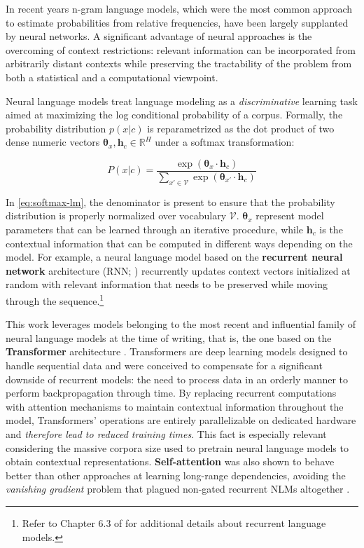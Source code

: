 \documentclass[a4paper, nobind]{templates/ociamthesis}
\begin{document}
In recent years n-gram language models, which were the most common approach to estimate probabilities from relative frequencies, have been largely supplanted by neural networks. A significant advantage of neural approaches is the overcoming of context restrictions: relevant information can be incorporated from arbitrarily distant contexts while preserving the tractability of the problem from both a statistical and a computational viewpoint.

Neural language models treat language modeling as a \emph{discriminative} learning task aimed at maximizing the log conditional probability of a corpus. Formally, the probability distribution \(p(x|c)\) is reparametrized as the dot product of two dense numeric vectors \(\boldsymbol\theta_x, \boldsymbol h_c \in \mathbb{R}^H\) under a softmax transformation:

\begin{equation}
P(x|c) = \frac{\exp(\boldsymbol\theta_x \cdot \boldsymbol h_c)}{\sum_{x'\in\mathcal{V}} \exp(\boldsymbol\theta_{x'} \cdot \boldsymbol h_c)}
\label{eq:softmax-lm}
\end{equation}

In \eqref{eq:softmax-lm}, the denominator is present to ensure that the probability distribution is properly normalized over vocabulary \(\mathcal{V}\). \(\boldsymbol\theta_x\) represent model parameters that can be learned through an iterative procedure, while \(\boldsymbol h_c\) is the contextual information that can be computed in different ways depending on the model. For example, a neural language model based on the \textbf{recurrent neural network} architecture (RNN; \textcite{mikolov-etal-2010-recurrent}) recurrently updates context vectors initialized at random with relevant information that needs to be preserved while moving through the sequence.\footnote{Refer to Chapter 6.3 of \textcite{eisenstein-2019-introduction} for additional details about recurrent language models.}

This work leverages models belonging to the most recent and influential family of neural language models at the time of writing, that is, the one based on the \textbf{Transformer} architecture \autocite{vaswani-etal-2017-attention}. Transformers are deep learning models designed to handle sequential data and were conceived to compensate for a significant downside of recurrent models: the need to process data in an orderly manner to perform backpropagation through time. By replacing recurrent computations with attention mechanisms to maintain contextual information throughout the model, Transformers' operations are entirely parallelizable on dedicated hardware and \emph{therefore lead to reduced training times}. This fact is especially relevant considering the massive corpora size used to pretrain neural language models to obtain contextual representations. \textbf{Self-attention} was also shown to behave better than other approaches at learning long-range dependencies, avoiding the \emph{vanishing gradient} problem that plagued non-gated recurrent NLMs altogether \autocite{pascanu-etal-2013-difficulty}.
\end{document}
